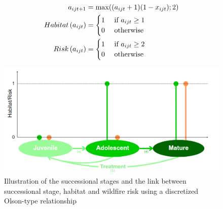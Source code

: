    \begin{align}
a_{ijt+1} &= \max \large((a_{ijt} + 1)(1-x_{ijt}); 2 \large)
\label{eq:fuel_dyn}\\
Habitat\left(a_{ijt}\right) &= \begin{cases}
        1 &\text{ if } a_{ijt} \geq 1\\
        0 &\text{ otherwise }
    \end{cases}
\label{eq:mature}\\
Risk\left(a_{ijt}\right) &= \begin{cases}
1 &\text{ if }a_{ijt}\geq 2\\
0 &\text{ otherwise}
    \end{cases}
\label{eq:high_fuel}
\end{align}
\hfill
\begin{figure}
    \centering
    \includegraphics[width = .6\textwidth]{figures/wildland/Juvenile.png}
    \caption{Illustration of the successional stages and the link between successional stage, habitat and wildfire risk using a discretized Olson-type relationship}
    \label{fig:illustration}
\end{figure}




